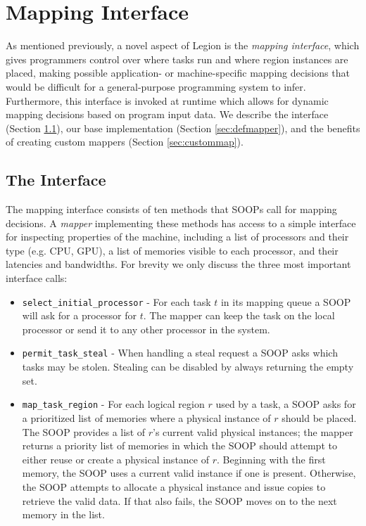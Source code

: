 \section{Mapping Interface}
\label{sec:mapping}

As mentioned previously, a novel aspect of Legion is the {\em mapping interface},
which gives programmers control over where tasks run and where region instances are placed,
making possible application- or machine-specific mapping decisions that would be difficult for a 
general-purpose programming system to infer.  Furthermore, this interface is invoked at runtime which
allows for dynamic mapping decisions based on program input data.
We describe the interface (Section \ref{sec:mapinterface}),
our base implementation (Section \ref{sec:defmapper}), and the benefits
of creating custom mappers (Section \ref{sec:custommap}).

\subsection{The Interface}
\label{sec:mapinterface}

The mapping interface consists of ten methods that SOOPs call for
mapping decisions.  A {\em mapper} implementing these methods has access to a simple interface
for inspecting properties of the machine, including a list of
processors and their type (e.g. CPU, GPU), a list of
memories visible to each processor, and their latencies and bandwidths.
For brevity we only discuss the three most important interface calls:

\begin{itemize}
\item {\tt select\_initial\_processor} - For each task $t$ in its mapping queue a SOOP will
ask for a processor for $t$.  The mapper can keep the task on the local processor or send it to 
any other processor in the system.

\item {\tt permit\_task\_steal} - When handling a steal request a SOOP
asks which tasks may be stolen.  Stealing can be disabled by always returning the empty set.

\item {\tt map\_task\_region} - For each logical region $r$ used by a task, a
SOOP asks for a prioritized list of memories where a physical instance of $r$ should be placed.  
The SOOP provides a list of $r$'s current valid physical instances;
the mapper returns a priority list of memories in which the SOOP
should attempt to either reuse or create a physical instance of $r$.  Beginning with
the first memory, the SOOP uses a current valid instance if one is present.  Otherwise,
the SOOP attempts to allocate a physical instance and issue copies
to retrieve the valid data.  If that also fails, the SOOP moves on to the next memory in the list.
\end{itemize}


